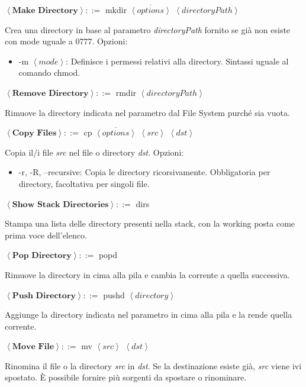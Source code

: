 \noindent$\left<\textbf{Make Directory}\right>::=$ mkdir $\overline{\left<options\right>}$ $\left<directoryPath\right>$\par
Crea una directory in base al parametro \textit{directoryPath} fornito se già non esiste con mode uguale a $0777$. Opzioni: \begin{itemize}
	\item -m $\left<mode\right>$: Definisce i permessi relativi alla directory. Sintassi uguale al comando chmod.
\end{itemize}

\noindent$\left<\textbf{Remove Directory}\right>::=$ rmdir $\left<directoryPath\right>$\par
Rimuove la directory indicata nel parametro dal File System purché sia vuota.\newline

\noindent$\left<\textbf{Copy Files}\right>::=$ cp $\overline{\left<options\right>}$ $\left<src\right>$ $\left<dst\right>$\par
Copia il/i file \textit{src} nel file o directory \textit{dst}. Opzioni: \begin{itemize}
	\item -r, -R, --recursive: Copia le directory ricorsivamente. Obbligatoria per directory, facoltativa per singoli file.
\end{itemize}

\noindent$\left<\textbf{Show Stack Directories}\right>::=$ dirs\par
Stampa una lista delle directory presenti nella stack, con la working posta come prima voce dell'elenco.\newline

\noindent$\left<\textbf{Pop Directory}\right>::=$ popd\par
Rimuove la directory in cima alla pila e cambia la corrente a quella successiva.\newline

\noindent$\left<\textbf{Push Directory}\right>::=$ pushd $\left<directory\right>$\par
Aggiunge la directory indicata nel parametro in cima alla pila e la rende quella corrente.\newline

\noindent$\left<\textbf{Move File}\right>::=$ mv $\left<src\right>$ $\left<dst\right>$\par
Rinomina il file o la directory \textit{src} in \textit{dst}. Se la destinazione esiste già, \textit{src} viene ivi spostato. È possibile fornire più
sorgenti da spostare o rinominare.\newline

